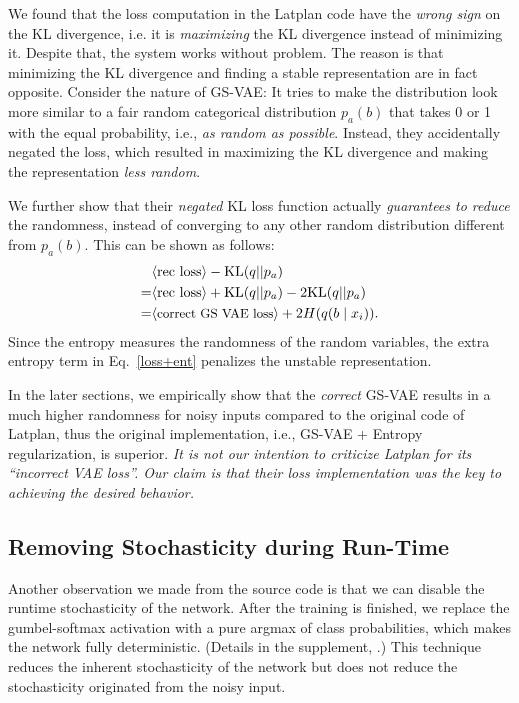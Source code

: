 We found that the loss computation in the Latplan code have the \emph{wrong sign} on the KL divergence,
i.e. it is \emph{maximizing} the KL divergence instead of minimizing it.
Despite that, the system works without problem.
% 
The reason is that minimizing the KL divergence and finding a stable representation are in fact opposite.
Consider the nature of GS-VAE:
It tries to make the distribution look more similar to a fair random categorical distribution $p_a(b)$
that takes 0 or 1 with the equal probability, i.e., \emph{as random as possible}.
Instead, they accidentally negated the loss, which resulted in
maximizing the KL divergence and making the representation \emph{less random}.

We further show that their \emph{negated} KL loss function
actually \emph{guarantees to reduce} the randomness,
instead of converging to any other random distribution different from $p_a(b)$.
This can be shown as follows:
\begin{align} 
\nonumber  &\brackets{\text{rec loss}}-{\mathrm{KL}}(q||p_a)                                    \\
\nonumber =&\brackets{\text{rec loss}}+{\mathrm{KL}}(q||p_a) - 2 {\mathrm{KL}}(q||p_a)          \\
\label{loss+ent} =&\brackets{\text{\small correct GS VAE loss}}      + 2 H(q(b \mid x_i)).
\end{align}
Since the entropy measures the randomness of the random variables,
the extra entropy term in Eq.~\eqref{loss+ent} penalizes the unstable representation.

In the later sections, we empirically show that the \emph{correct} GS-VAE results in
a much higher randomness for noisy inputs compared to the original code of Latplan,
thus the original implementation, i.e., GS-VAE + Entropy regularization, is superior.
% 
\emph{It is not our intention to criticize Latplan for its ``incorrect VAE loss''.
Our claim is that their loss implementation was the key to achieving the desired behavior.}

\subsection{Removing Stochasticity during Run-Time}
\label{argmax}

Another observation we made from the source code is that we can
disable the runtime stochasticity of the network.
After the training is finished, we replace the gumbel-softmax activation with
a pure argmax of class probabilities, which makes the network fully deterministic.
(Details in the supplement, .)
This technique reduces the inherent stochasticity of the network
but does not reduce the stochasticity originated from the noisy input.

